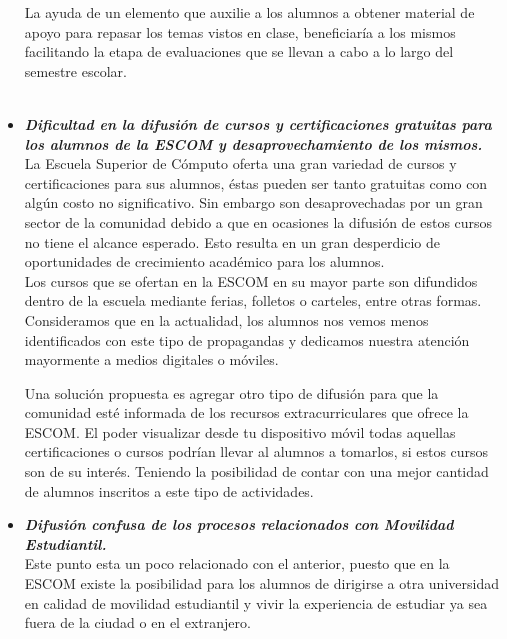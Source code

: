\begin{itemize}
		La ayuda de un elemento que auxilie a los alumnos a obtener material de apoyo para repasar los temas vistos en clase, beneficiaría a los mismos facilitando la etapa de evaluaciones que se llevan a cabo a lo largo del semestre escolar.\\ \\
		
		\item \textbf{\textit{Dificultad en la  difusión de cursos y certificaciones gratuitas para los alumnos de la ESCOM y desaprovechamiento de los mismos.}}\\
		
		La Escuela Superior de Cómputo oferta una gran variedad de cursos y certificaciones para sus alumnos, éstas pueden ser tanto gratuitas como con algún costo no significativo. Sin embargo son desaprovechadas por un gran sector de la comunidad debido a que en ocasiones la difusión de estos cursos no tiene el alcance esperado. Esto resulta en un gran desperdicio de oportunidades de crecimiento académico para los alumnos.\\
		
		Los cursos que se ofertan en la ESCOM en su mayor parte son difundidos dentro de la escuela mediante ferias, folletos o carteles, entre otras formas. Consideramos que en la actualidad, los alumnos nos vemos menos identificados con este tipo de propagandas y dedicamos nuestra atención mayormente a medios digitales o móviles.
		
		Una solución propuesta es agregar otro tipo de difusión para que la comunidad esté informada de los recursos extracurriculares que ofrece la ESCOM. El poder visualizar desde tu dispositivo móvil todas aquellas certificaciones o cursos podrían llevar al alumnos a tomarlos, si estos cursos son de su interés. Teniendo la posibilidad de contar con una mejor cantidad de alumnos inscritos a este tipo de actividades.\\ 
		
		
		
		\item \textbf{\textit{Difusión confusa de los procesos relacionados con Movilidad Estudiantil.}}\\
		
		Este punto esta un poco relacionado con el anterior, puesto que en la ESCOM existe la posibilidad para los alumnos de dirigirse a otra universidad en calidad de movilidad estudiantil y vivir la experiencia de estudiar ya sea fuera de la ciudad o en el extranjero. \\
		

\end{itemize}
